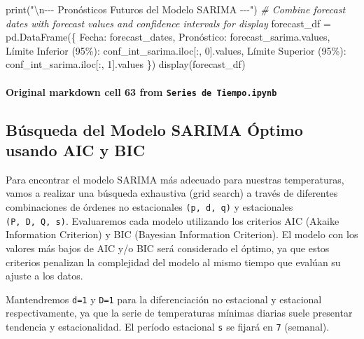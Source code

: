 \documentclass[
  11pt,
]{article}
\newenvironment{Shaded}{}{}
\newcommand{\BuiltInTok}[1]{\textcolor[rgb]{0.00,0.50,0.00}{#1}}
\newcommand{\CharTok}[1]{\textcolor[rgb]{0.25,0.44,0.63}{#1}}
\newcommand{\CommentTok}[1]{\textcolor[rgb]{0.38,0.63,0.69}{\textit{#1}}}
\newcommand{\DecValTok}[1]{\textcolor[rgb]{0.25,0.63,0.44}{#1}}
\newcommand{\NormalTok}[1]{#1}
\newcommand{\OperatorTok}[1]{\textcolor[rgb]{0.40,0.40,0.40}{#1}}
\newcommand{\StringTok}[1]{\textcolor[rgb]{0.25,0.44,0.63}{#1}}
\begin{document}
\begin{Shaded}
\begin{Highlighting}[]
\BuiltInTok{print}\NormalTok{(}\StringTok{"}\CharTok{\textbackslash{}n}\StringTok{{-}{-}{-} Pronósticos Futuros del Modelo SARIMA {-}{-}{-}"}\NormalTok{)}
\CommentTok{\# Combine forecast dates with forecast values and confidence intervals for display}
\NormalTok{forecast\_df }\OperatorTok{=}\NormalTok{ pd.DataFrame(\{}
    \StringTok{\textquotesingle{}Fecha\textquotesingle{}}\NormalTok{: forecast\_dates,}
    \StringTok{\textquotesingle{}Pronóstico\textquotesingle{}}\NormalTok{: forecast\_sarima.values,}
    \StringTok{\textquotesingle{}Límite Inferior (95\%)\textquotesingle{}}\NormalTok{: conf\_int\_sarima.iloc[:, }\DecValTok{0}\NormalTok{].values,}
    \StringTok{\textquotesingle{}Límite Superior (95\%)\textquotesingle{}}\NormalTok{: conf\_int\_sarima.iloc[:, }\DecValTok{1}\NormalTok{].values}
\NormalTok{\})}
\NormalTok{display(forecast\_df)}
\end{Highlighting}
\end{Shaded}

\paragraph{\texorpdfstring{Original markdown cell 63 from \texttt{Series\ de\ Tiempo.ipynb}}{Original markdown cell 63 from Series de Tiempo.ipynb}}\label{original-markdown-cell-63-from-series-de-tiempoipynb}

\subsection{Búsqueda del Modelo SARIMA Óptimo usando AIC y BIC}\label{buxfasqueda-del-modelo-sarima-uxf3ptimo-usando-aic-y-bic}

Para encontrar el modelo SARIMA más adecuado para nuestras temperaturas, vamos a realizar una búsqueda exhaustiva (grid search) a través de diferentes combinaciones de órdenes no estacionales \texttt{(p,\ d,\ q)} y estacionales \texttt{(P,\ D,\ Q,\ s)}. Evaluaremos cada modelo utilizando los criterios AIC (Akaike Information Criterion) y BIC (Bayesian Information Criterion). El modelo con los valores más bajos de AIC y/o BIC será considerado el \textquotesingle óptimo\textquotesingle, ya que estos criterios penalizan la complejidad del modelo al mismo tiempo que evalúan su ajuste a los datos.

Mantendremos \texttt{d=1} y \texttt{D=1} para la diferenciación no estacional y estacional respectivamente, ya que la serie de temperaturas mínimas diarias suele presentar tendencia y estacionalidad. El período estacional \texttt{s} se fijará en \texttt{7} (semanal).
\end{document}
